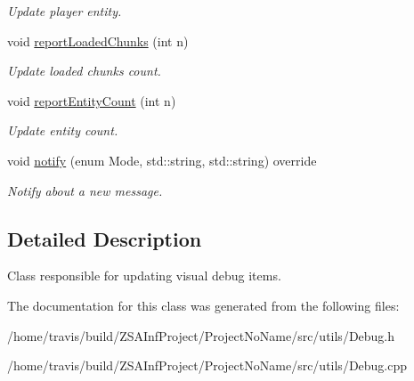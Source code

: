 \begin{DoxyCompactItemize}
\begin{DoxyCompactList}\small\item\em Update player entity. \end{DoxyCompactList}\item 
\hypertarget{classDebug_afc1e08fb844555f357b5f102a3b0a554}{void \hyperlink{classDebug_afc1e08fb844555f357b5f102a3b0a554}{report\-Loaded\-Chunks} (int n)}\label{classDebug_afc1e08fb844555f357b5f102a3b0a554}

\begin{DoxyCompactList}\small\item\em Update loaded chunks count. \end{DoxyCompactList}\item 
\hypertarget{classDebug_a36ded885c182f5154687c20d862fd806}{void \hyperlink{classDebug_a36ded885c182f5154687c20d862fd806}{report\-Entity\-Count} (int n)}\label{classDebug_a36ded885c182f5154687c20d862fd806}

\begin{DoxyCompactList}\small\item\em Update entity count. \end{DoxyCompactList}\item 
\hypertarget{classDebug_a615e0ffabb0e20061ae0bce633f12f63}{void \hyperlink{classDebug_a615e0ffabb0e20061ae0bce633f12f63}{notify} (enum Mode, std\-::string, std\-::string) override}\label{classDebug_a615e0ffabb0e20061ae0bce633f12f63}

\begin{DoxyCompactList}\small\item\em Notify about a new message. \end{DoxyCompactList}\end{DoxyCompactItemize}


\subsection{Detailed Description}
Class responsible for updating visual debug items. 

The documentation for this class was generated from the following files\-:\begin{DoxyCompactItemize}
\item 
/home/travis/build/\-Z\-S\-A\-Inf\-Project/\-Project\-No\-Name/src/utils/Debug.\-h\item 
/home/travis/build/\-Z\-S\-A\-Inf\-Project/\-Project\-No\-Name/src/utils/Debug.\-cpp\end{DoxyCompactItemize}
